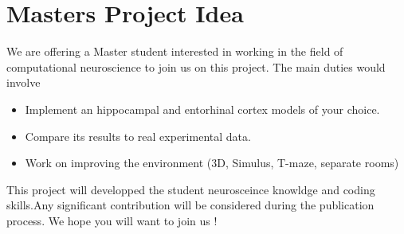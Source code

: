 \documentclass{article}
\begin{document}
\section{Masters Project Idea}

We are offering a Master student interested in working in the field of computational neuroscience to join us on this project. The main duties would involve
\begin{itemize}
\item Implement an hippocampal and entorhinal cortex models of your choice.

\item Compare its results to real experimental data.

\item Work on improving the environment 
(3D, Simulus, T-maze, separate rooms)


\end{itemize}
This project will developped the student neurosceince knowldge and coding skills.Any significant contribution will be considered during the publication process. We hope you will want to join us !



\end{document}
